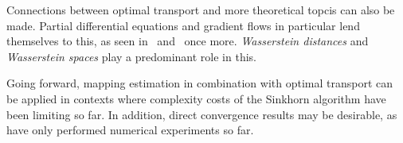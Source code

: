 Connections between optimal transport and more theoretical topcis can also be made. Partial differential equations and gradient flows in particular lend themselves to this, as seen in\ \cite{Ambr2005} and\ \cite{San2015} once more. \textit{Wasserstein distances} and \textit{Wasserstein spaces} play a predominant role in this.

Going forward, mapping estimation in combination with optimal transport can be applied in contexts where complexity costs of the Sinkhorn algorithm have been limiting so far. In addition, direct convergence results may be desirable, as\ \cite{Seg2018} have only performed numerical experiments so far.



